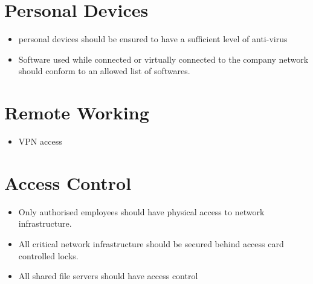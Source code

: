 \section{Personal Devices}
\begin{itemize}
    \item personal devices should be ensured to have a sufficient level of anti-virus
    \item Software used while connected or virtually connected to the company network should conform to an allowed list of softwares.
\end{itemize}

\section{Remote Working}
\begin{itemize}
    \item VPN access
\end{itemize}

\section{Access Control}
\begin{itemize}
    \item Only authorised employees should have physical access to network infrastructure.
    \item All critical network infrastructure should be secured behind access card controlled locks.
    \item All shared file servers should have access control 
\end{itemize}